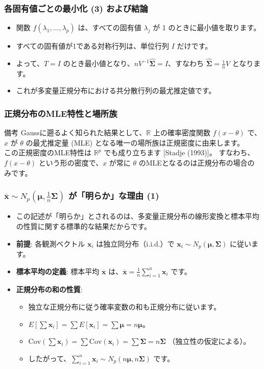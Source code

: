 \documentclass{beamer}
\begin{document}
\begin{frame}
\frametitle{各固有値ごとの最小化 (3) および結論}
\begin{itemize}
    \item 関数 $f(\lambda_1,\dots,\lambda_p)$ は、すべての固有値 $\lambda_j$ が 1 のときに最小値を取ります。
    \item すべての固有値が1である対称行列は、単位行列 $I$ だけです。
    \item よって、$T = I$ のとき最小値となり、$nV^{-1}\hat{\bm{\Sigma}} = I$、すなわち $\hat{\bm{\Sigma}} = \frac{1}{n}V$ となります。
    \item これが多変量正規分布における共分散行列の最尤推定値です。
\end{itemize}
\end{frame}

\begin{frame}
\frametitle{正規分布のMLE特性と場所族}
\begin{block}{備考}
Gaussに遡るよく知られた結果として、$\mathbb{R}$ 上の確率密度関数 $f(x-\theta)$ で、$x$ が $\theta$ の最尤推定量 (MLE) となる唯一の場所族は正規密度に由来します。\\
この正規密度のMLE特性は $\mathbb{R}^p$ でも成り立ちます [Stadje (1993)]。
すなわち、$f(x-\theta)$ という形の密度で、$x$ が常に $\theta$ のMLEとなるのは正規分布の場合のみです。
\end{block}
\end{frame}

\begin{frame}
\frametitle{$\overline{\bm{x}}\sim N_{p}(\bm{\mu},\frac{1}{n}\bm{\Sigma})$ が「明らか」な理由 (1)}
\begin{itemize}
    \item この記述が「明らか」とされるのは、多変量正規分布の線形変換と標本平均の性質に関する標準的な結果だからです。
    \item \textbf{前提}: 各観測ベクトル $\bm{x}_i$ は独立同分布（i.i.d.）で $\bm{x}_i\sim N_{p}(\bm{\mu},\bm{\Sigma})$ に従います。
    \item \textbf{標本平均の定義}: 標本平均 $\overline{\bm{x}}$ は、$\overline{\bm{x}}=\frac{1}{n}\sum_{i=1}^{n}\bm{x}_i$ です。
    \item \textbf{正規分布の和の性質}:
    \begin{itemize}
        \item 独立な正規分布に従う確率変数の和も正規分布に従います。
        \item $E[\sum\bm{x}_i]=\sum E[\bm{x}_i]=\sum\bm{\mu}=n\bm{\mu}$。
        \item $\text{Cov}(\sum\bm{x}_i)=\sum\text{Cov}(\bm{x}_i)=\sum\bm{\Sigma}=n\bm{\Sigma}$ （独立性の仮定による）。
        \item したがって、$\sum_{i=1}^{n}\bm{x}_i\sim N_{p}(n\bm{\mu},n\bm{\Sigma})$ です。
    \end{itemize}
\end{itemize}
\end{frame}
\end{document}

